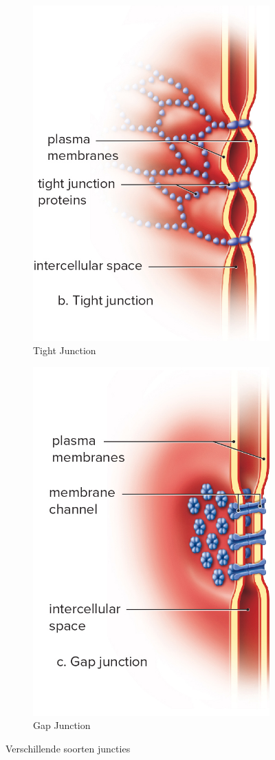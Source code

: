\documentclass[a4paper,kul]{kulakarticle} %
\begin{document}
\begin{figure}[h]
\begin{subfigure}{.33\textwidth}
		\includegraphics[width=0.7\linewidth]{Tight_Junctie}
		\caption{Tight Junction}
		\label{fig:Tight}
	\end{subfigure}%
	\begin{subfigure}{.33\textwidth}
	\centering
	\includegraphics[width=0.7\linewidth]{Gap_Junctie}
	\caption{Gap Junction}
	\label{fig:Gap}
	\end{subfigure}
	\caption{Verschillende soorten juncties}
	\label{fig:Juncites}
\end{figure}
\end{document}
